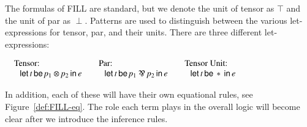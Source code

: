 \documentclass{elsarticle}
\newcommand{\FILLnt}[1]{\mathit{#1}}
\begin{document}
The formulas of FILL are standard, but we denote the unit of tensor as
$\top$ and the unit of par as $\perp$. Patterns are used to
distinguish between the various let-expressions for tensor, par, and
their units.  There are three different let-expressions:
\begin{center}
  \begin{math}
    \begin{array}{lll}
      \begin{array}{lll}
        \text{Tensor:}\\
        \,\,\,\, \mathsf{let}\, \FILLnt{t} \,\mathsf{be}\,  \FILLnt{p_{{\mathrm{1}}}}  \otimes  \FILLnt{p_{{\mathrm{2}}}}  \,\mathsf{in}\, \FILLnt{e} 
      \end{array}
      &
      \begin{array}{lll}
        \text{Par:}\\
        \,\,\,\, \mathsf{let}\, \FILLnt{t} \,\mathsf{be}\,  \FILLnt{p_{{\mathrm{1}}}}  \parr  \FILLnt{p_{{\mathrm{2}}}}  \,\mathsf{in}\, \FILLnt{e} 
      \end{array}
      &
      \begin{array}{lll}
        \text{Tensor Unit:}\\
        \,\,\,\, \mathsf{let}\, \FILLnt{t} \,\mathsf{be}\,  *  \,\mathsf{in}\, \FILLnt{e} 
      \end{array}
    \end{array}
  \end{math}
\end{center}
In addition, each of these will have their own equational rules, see
Figure~\ref{def:FILL-eq}.  The role each term plays in the overall
logic will become clear after we introduce the inference rules.
\end{document}
